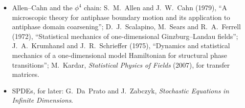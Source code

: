 \begin{itemize}
\item Allen--Cahn and the $\phi^4$ chain: S.~M.~Allen and J.~W.~Cahn (1979), ``A microscopic theory for antiphase boundary
  motion and its application to antiphase domain coarsening''; D.~J.~Scalapino, M.~Sears and R.~A.~Ferrell (1972),
  ``Statistical mechanics of one-dimensional Ginzburg--Landau fields''; J.~A.~Krumhansl and J.~R.~Schrieffer (1975),
  ``Dynamics and statistical mechanics of a one-dimensional model Hamiltonian for structural phase transitions'';
  M.~Kardar, \emph{Statistical Physics of Fields} (2007), for transfer matrices.
\item SPDEs, for later: G.~Da~Prato and J.~Zabczyk, \emph{Stochastic Equations in Infinite Dimensions}.
\end{itemize}
